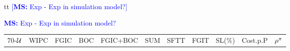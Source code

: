 \documentclass[envcountsame]{llncs}
\newcommand\MS[2][r]{\ifx t#1 \textcolor{blue}{[\textbf{MS:} #2]}
  \else \begin{center}\textcolor{blue}{\textbf{MS:} #2} \end{center} \fi}
\begin{document}
\MS[t]{Exp - Exp in simulation model?}
 \begin{table}[tb]
  \begin{center}
    \begin{tabular}{crrrccccccc}
      \toprule
      70-\(\mathcal{U}\)   & WIPC              & FGIC              & BOC                & FGIC+BOC                        & SUM                & SFTT          & FGIT                & SL(\%)       & Cost.p.P             & \(\rho^{\pi}\) \\

\end{tabular}
\end{center}
\end{table}
\end{document}
